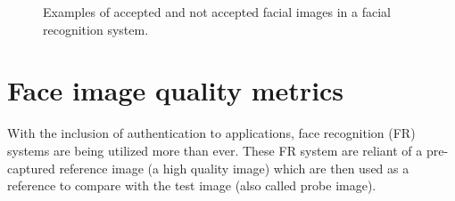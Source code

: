 \begin{figure}[h]
    
\caption{Examples of accepted and not accepted facial images in a facial recognition system.}
\label{fig:image_properties}

\end{figure}

\section{Face image quality metrics} 
With the inclusion of authentication to applications, face recognition (FR) systems are being utilized more than ever. These FR system are reliant of a pre-captured reference image (a high quality image) which are then used as a reference to compare with the test image (also called probe image). 

